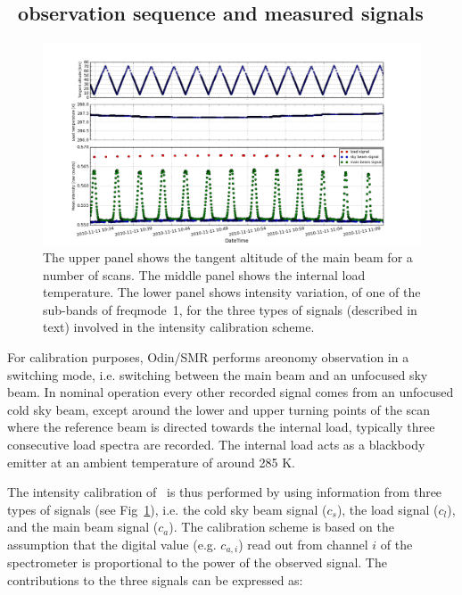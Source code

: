 \subsection{\smr\ observation sequence and measured signals} 
\label{sec:smrobs}

\begin{figure}[t]
\includegraphics[width=14cm]{cal_signals.png}
\caption{ The upper panel shows the tangent altitude of the main beam
for a number of scans.
The middle panel shows the internal load temperature.
The lower panel shows intensity variation, 
of one of the sub-bands of freqmode~1,
for the three types of signals (described in text) involved
in the intensity calibration scheme.}
\label{fig:intensityvar}
\end{figure}



For calibration purposes, Odin/SMR performs areonomy observation in a switching
mode, i.e. switching between the main beam and an unfocused sky beam. 
In nominal operation every other recorded signal comes from an unfocused cold sky
beam, except around the lower and upper turning points of the scan where the reference
beam is directed towards the internal load, typically three consecutive load spectra are
recorded. The internal load acts as a blackbody emitter at an ambient temperature of around 285
K. 

The intensity calibration of \smr\ is thus performed by using
information from three types of signals (see Fig~\ref{fig:intensityvar}), 
i.e. the cold sky beam signal (\(c_{s}\)), the load signal (\(c_{l}\)), 
and the main beam signal (\(c_{a}\)).
The calibration scheme is based on the assumption that the
digital value (e.g. \(c_{a,i}\)) read out from channel \(i\) of the
spectrometer is proportional to the power of the
observed signal. The contributions to the three signals
can be expressed as:

